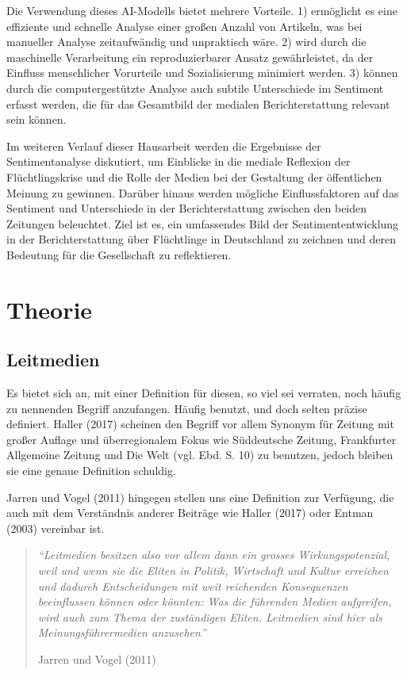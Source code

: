 \documentclass[
  11pt,
]{article}
\begin{document}
Die Verwendung dieses AI-Modells bietet mehrere Vorteile. 1) ermöglicht
es eine effiziente und schnelle Analyse einer großen Anzahl von
Artikeln, was bei manueller Analyse zeitaufwändig und unpraktisch wäre.
2) wird durch die maschinelle Verarbeitung ein reproduzierbarer Ansatz
gewährleistet, da der Einfluss menschlicher Vorurteile und
Sozialisierung minimiert werden. 3) können durch die computergestützte
Analyse auch subtile Unterschiede im Sentiment erfasst werden, die für
das Gesamtbild der medialen Berichterstattung relevant sein können.

Im weiteren Verlauf dieser Hausarbeit werden die Ergebnisse der
Sentimentanalyse diskutiert, um Einblicke in die mediale Reflexion der
Flüchtlingskrise und die Rolle der Medien bei der Gestaltung der
öffentlichen Meinung zu gewinnen. Darüber hinaus werden mögliche
Einflussfaktoren auf das Sentiment und Unterschiede in der
Berichterstattung zwischen den beiden Zeitungen beleuchtet. Ziel ist es,
ein umfassendes Bild der Sentimententwicklung in der Berichterstattung
über Flüchtlinge in Deutschland zu zeichnen und deren Bedeutung für die
Gesellschaft zu reflektieren.

\hypertarget{theorie}{%
\section{Theorie}\label{theorie}}

\hypertarget{leitmedien}{%
\subsection{Leitmedien}\label{leitmedien}}

Es bietet sich an, mit einer Definition für diesen, so viel sei
verraten, noch häufig zu nennenden Begriff anzufangen. Häufig benutzt,
und doch selten präzise definiert. Haller (2017) scheinen den Begriff
vor allem Synonym für Zeitung mit großer Auflage und überregionalem
Fokus wie Süddeutsche Zeitung, Frankfurter Allgemeine Zeitung und Die
Welt (vgl. Ebd. S. 10) zu benutzen, jedoch bleiben sie eine genaue
Definition schuldig.

Jarren und Vogel (2011) hingegen stellen uns eine Definition zur
Verfügung, die auch mit dem Verständnis anderer Beiträge wie Haller
(2017) oder Entman (2003) vereinbar ist.

\begin{quote}
\emph{``Leitmedien besitzen also vor allem dann ein grosses
Wirkungspotenzial, weil und wenn sie die Eliten in Politik, Wirtschaft
und Kultur erreichen und dadurch Entscheidungen mit weit reichenden
Konsequenzen beeinflussen können oder könnten: Was die führenden Medien
aufgreifen, wird auch zum Thema der zuständigen Eliten. Leitmedien sind
hier als Meinungsführermedien anzusehen''}

Jarren und Vogel (2011)
\end{quote}
\end{document}
